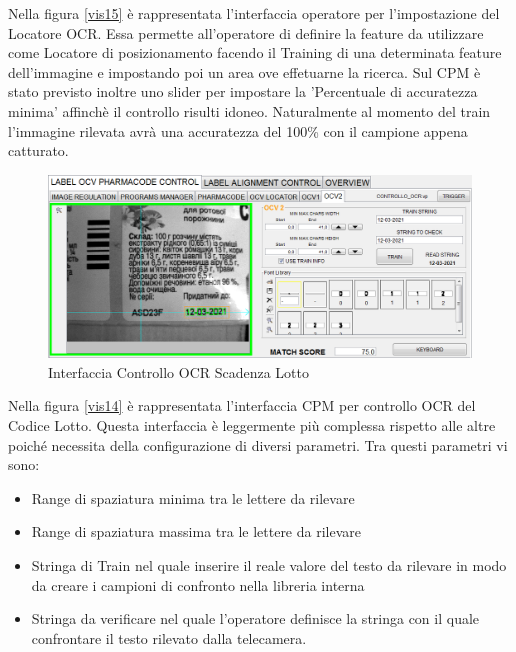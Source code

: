 \documentclass[12pt, a4paper, oneside]{book}
\begin{document}
Nella figura \ref{vis15} è rappresentata l'interfaccia operatore per l'impostazione del Locatore OCR. Essa permette all'operatore di definire la feature da utilizzare come Locatore di posizionamento facendo il Training di una determinata feature dell'immagine e impostando poi un area ove effetuarne la ricerca. Sul CPM è stato previsto inoltre uno slider per impostare la 'Percentuale di accuratezza minima' affinchè il controllo risulti idoneo. Naturalmente al momento del train l'immagine rilevata avrà una accuratezza del 100\% con il campione appena catturato.

\begin{figure}[H]
	\centering
	\includegraphics[width=13cm]{Immagini/VIS16}
	\caption{Interfaccia Controllo OCR Scadenza Lotto}
	\label{vis16}
\end{figure}

Nella figura \ref{vis14} è rappresentata l'interfaccia CPM per controllo OCR del Codice Lotto. Questa interfaccia è leggermente più complessa rispetto alle altre poiché necessita della configurazione di diversi parametri. Tra questi parametri vi sono:
\begin{itemize}
	\item Range di spaziatura minima tra le lettere da rilevare
	\item Range di spaziatura massima tra le lettere da rilevare
	\item Stringa di Train nel quale inserire il reale valore del testo da rilevare in modo da creare i campioni di confronto nella libreria interna
	\item Stringa da verificare nel quale l'operatore definisce la stringa con il quale confrontare il testo rilevato dalla telecamera. 
\end{itemize}
\end{document}
